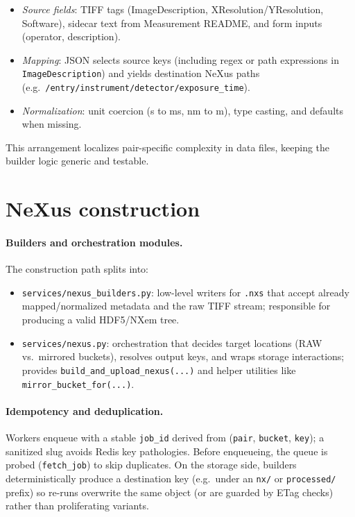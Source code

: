 \begin{itemize}
	\item \emph{Source fields}: TIFF tags (ImageDescription, XResolution/YResolution, Software), sidecar text from Measurement README, and form inputs (operator, description).
	\item \emph{Mapping}: JSON selects source keys (including regex or path expressions in \texttt{ImageDescription}) and yields destination NeXus paths (e.g.\ \texttt{/entry/instrument/detector/exposure\_time}).
	\item \emph{Normalization}: unit coercion (s to ms, nm to m), type casting, and defaults when missing.
\end{itemize}

This arrangement localizes pair-specific complexity in data files, keeping the builder logic generic and testable.

\section{NeXus construction}\label{sec:nexus-construction}

\paragraph{Builders and orchestration modules.}
The construction path splits into:
\begin{itemize}
	\item \texttt{services/nexus\_builders.py}: low-level writers for \texttt{.nxs} that accept already mapped/normalized metadata and the raw TIFF stream; responsible for producing a valid HDF5/NXem tree.
	\item \texttt{services/nexus.py}: orchestration that decides target locations (RAW vs.\ mirrored buckets), resolves output keys, and wraps storage interactions; provides \texttt{build\_and\_upload\_nexus(...)} and helper utilities like \texttt{mirror\_bucket\_for(...)}.
\end{itemize}

\paragraph{Idempotency and deduplication.}
Workers enqueue with a stable \texttt{job\_id} derived from (\texttt{pair}, \texttt{bucket}, \texttt{key}); a sanitized slug avoids Redis key pathologies. Before enqueueing, the queue is probed (\texttt{fetch\_job}) to skip duplicates. On the storage side, builders deterministically produce a destination key (e.g.\ under an \texttt{nx/} or \texttt{processed/} prefix) so re-runs overwrite the same object (or are guarded by ETag checks) rather than proliferating variants.

